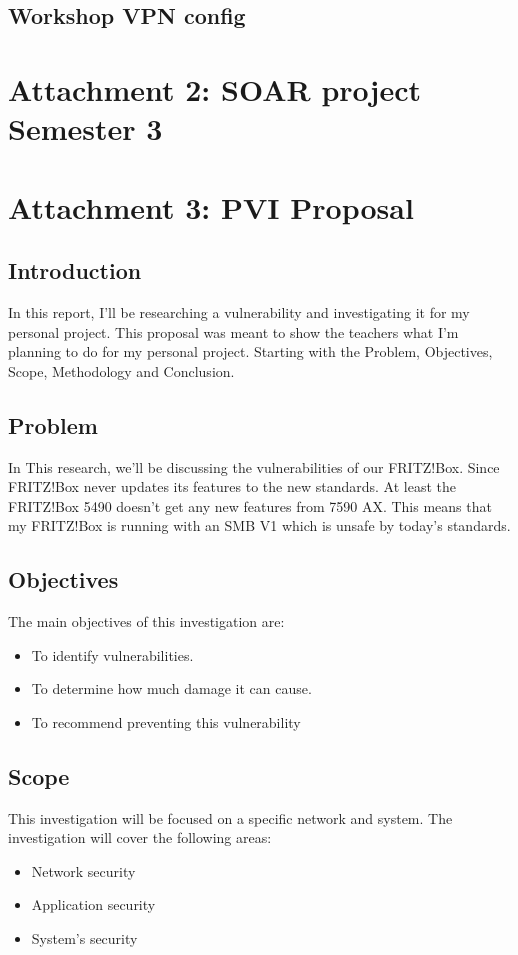\documentclass[12pt, letterpaper]{article}
\begin{document}
\subsection{Workshop VPN config}


\newpage
\section{Attachment 2: SOAR project Semester 3}
\label{soarpdf}

\newpage
\section{Attachment 3: PVI Proposal}
\subsection{Introduction}
In this report, I'll be researching a vulnerability and investigating it for my personal project. This proposal was meant to show the teachers what I'm planning to do for my personal project. Starting with the Problem, Objectives, Scope, Methodology and Conclusion.
\subsection{Problem}
In This research, we'll be discussing the vulnerabilities of our FRITZ!Box. Since FRITZ!Box never updates its features to the new standards. At least the FRITZ!Box 5490 doesn't get any new features from 7590 AX. This means that my FRITZ!Box is running with an SMB V1 which is unsafe by today's standards.
\subsection{Objectives}
The main objectives of this investigation are:
\begin{itemize}
    \item To identify vulnerabilities.
    \item To determine how much damage it can cause.
    \item To recommend preventing this vulnerability 
\end{itemize}
\subsection{Scope}
This investigation will be focused on a specific network and system. The investigation will cover the following areas:
\begin{itemize}
    \item Network security
    \item Application security
    \item System's security
\end{itemize}
\end{document}
